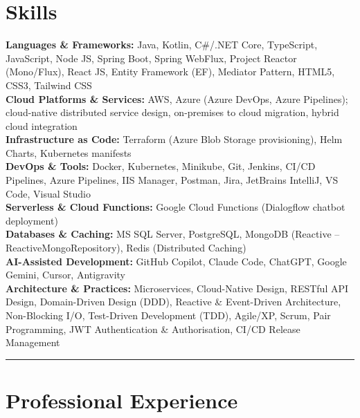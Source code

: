 \documentclass[a4paper,10pt]{article}
\newcommand{\sectionline}{\vspace{-0.1em}\noindent\rule{\linewidth}{0.6pt}\vspace{-0.7em}}
\begin{document}
\section*{Skills}
\textbf{Languages \& Frameworks:} Java, Kotlin, C\#/.NET Core, TypeScript, JavaScript, Node JS, Spring Boot, Spring WebFlux, Project Reactor (Mono/Flux), React JS, Entity Framework (EF), Mediator Pattern, HTML5, CSS3, Tailwind CSS \\
\textbf{Cloud Platforms \& Services:} AWS, Azure (Azure DevOps, Azure Pipelines); cloud-native distributed service design, on-premises to cloud migration, hybrid cloud integration \\
\textbf{Infrastructure as Code:} Terraform (Azure Blob Storage provisioning), Helm Charts, Kubernetes manifests \\
\textbf{DevOps \& Tools:} Docker, Kubernetes, Minikube, Git, Jenkins, CI/CD Pipelines, Azure Pipelines, IIS Manager, Postman, Jira, JetBrains IntelliJ, VS Code, Visual Studio \\
\textbf{Serverless \& Cloud Functions:} Google Cloud Functions (Dialogflow chatbot deployment) \\
\textbf{Databases \& Caching:} MS SQL Server, PostgreSQL, MongoDB (Reactive -- ReactiveMongoRepository), Redis (Distributed Caching) \\
\textbf{AI-Assisted Development:} GitHub Copilot, Claude Code, ChatGPT, Google Gemini, Cursor, Antigravity \\
\textbf{Architecture \& Practices:} Microservices, Cloud-Native Design, RESTful API Design, Domain-Driven Design (DDD), Reactive \& Event-Driven Architecture, Non-Blocking I/O, Test-Driven Development (TDD), Agile/XP, Scrum, Pair Programming, JWT Authentication \& Authorisation, CI/CD Release Management \\

\sectionline
\section*{Professional Experience}
\end{document}
